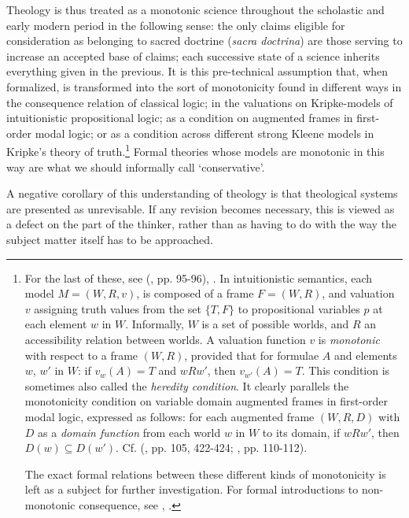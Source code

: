 \documentclass[]{birkjour}
\begin{document}
Theology is thus treated as a monotonic science throughout the scholastic and early modern period in the following sense: the only claims eligible for consideration as belonging to sacred doctrine (\textit{sacra doctrina}) are those serving to increase an accepted base of claims; each successive state of a science inherits everything given in the previous. It is this pre-technical assumption that, when formalized, is transformed into the sort of monotonicity found in different ways in the consequence relation of classical logic; in the valuations on Kripke-models of intuitionistic propositional logic; as a condition on augmented frames in first-order modal logic; or as a condition across different strong Kleene models in Kripke's theory of truth.\footnote{For the last of these, see (\cite{Gupta2001}, pp. 95-96), \cite{Kripke1975}. In intuitionistic semantics, each model $M = (W, R, v) $, is composed of a frame $F = (W, R)$, and valuation $v$ assigning truth values from the set $\{T, F\}$ to propositional variables $p$ at each element $w$ in $W$. Informally, $W$ is a set of possible worlds, and $R$ an accessibility relation between worlds. A valuation function $v$ is \textit{monotonic} with respect to a frame $(W, R)$, provided that for formulae $A$ and elements $w$, $w'$ in $W$: if $v_{w}(A) = T$ and $wRw'$, then $v_{w'}(A) = T$. This condition is sometimes also called the \textit{heredity condition}. It clearly parallels the monotonicity condition on variable domain augmented frames in first-order modal logic, expressed as follows: for each augmented frame $(W, R, D)$ with $D$ as a \textit{domain function} from each world $w$ in $W$ to its domain, if $wRw'$, then $D(w) \subseteq D(w')$. Cf. (\cite{Priest2008}, pp. 105, 422-424; \cite{Fitting1998}, pp. 110-112).

The exact formal relations between these different kinds of monotonicity is left as a subject for further investigation. For formal introductions to  non-monotonic consequence, see \cite{Horty2001}, \cite{Strasser2014}.} Formal theories whose models are monotonic in this way are what we should informally call `conservative'.

A negative corollary of this understanding of theology is that theological systems are presented as unrevisable. If any revision becomes necessary, this is viewed as a defect on the part of the thinker, rather than as having to do with the way the subject matter itself has to be approached.
\end{document}
